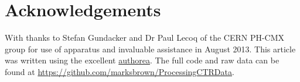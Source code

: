 \section*{Acknowledgements}
With thanks to Stefan Gundacker and Dr Paul Lecoq of the CERN PH-CMX group for use of apparatus and invaluable assistance in August 2013. This article was written using the excellent \href{www.authorea.com}{authorea}. The full code and raw data can be found at \href{https://github.com/marksbrown/ProcessingCTRData}{https://github.com/marksbrown/ProcessingCTRData}.